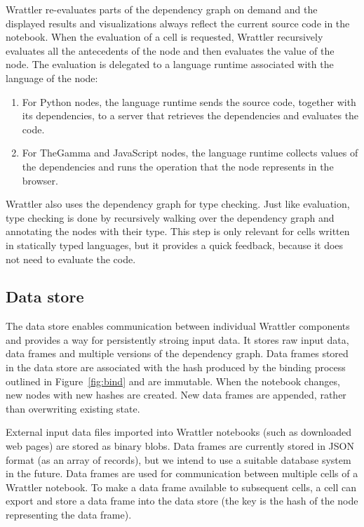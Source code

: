 \documentclass[sigplan]{acmart}\settopmatter{printfolios=true,printccs=false,printacmref=false}
\begin{document}
Wrattler re-evaluates parts of the dependency graph on demand and the displayed results and 
visualizations always reflect the current source code in the notebook. When the evaluation 
of a cell is requested, Wrattler recursively evaluates all the antecedents of the node and 
then evaluates the value of the node. The evaluation is delegated to a language
runtime associated with the language of the node:
%
\begin{enumerate}
\item For Python nodes, the language runtime sends the source code, together with its 
  dependencies, to a server that retrieves the dependencies and evaluates the code.
\item For TheGamma and JavaScript nodes, the language runtime collects values of the 
  dependencies and runs the operation that the node represents in the browser.
\end{enumerate}
%
Wrattler also uses the dependency graph for type checking. Just like evaluation, type checking
is done by recursively walking over the dependency graph and annotating the nodes with their 
type. This step is only relevant for cells written in statically typed languages, but it provides
a quick feedback, because it does not need to evaluate the code.

\subsection{Data store}
\label{sec:comp-data}

The data store enables communication between individual Wrattler components and provides a way for 
persistently stroing input data. It stores raw input data, data frames and multiple versions of the 
dependency graph. Data frames stored in the data store are associated with the hash produced by the 
binding process outlined in Figure~\ref{fig:bind} and are immutable. When the notebook changes, 
new nodes with new hashes are created. New data frames are appended, rather than overwriting 
existing state.

External input data files imported into Wrattler notebooks (such as downloaded web pages) are 
stored as binary blobs. Data frames are currently stored in JSON format (as an array of records),
but we intend to use a suitable database system in the future. Data frames are used for
communication between multiple cells of a Wrattler notebook. To make a data frame available to 
subsequent cells, a cell can export and store a data frame into the data store (the
key is the hash of the node representing the data frame). 
\end{document}
